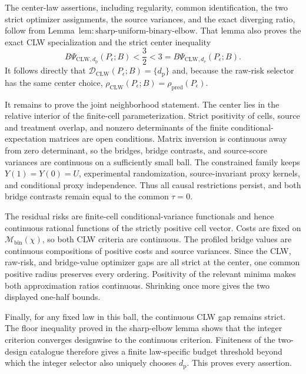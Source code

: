 The center-law assertions, including regularity, common identification, the two strict optimizer assignments, the source variances, and the exact diverging ratio, follow from Lemma~\(\mathrm{lem{:}sharp\text{-}uniform\text{-}binary\text{-}elbow}\). That lemma also proves the exact CLW specialization and the strict center inequality
\[
 B\Psi_{\mathrm{CLW},d_{\mathrm p}}(P_\epsilon;B)
 <\frac32<3
 =B\Psi_{\mathrm{CLW},d_{\mathrm e}}(P_\epsilon;B).        \tag{1}
\]
It follows directly that \(\mathcal D_{\mathrm{CLW}}(P_\epsilon;B)=\{d_{\mathrm p}\}\) and, because the raw-risk selector has the same center choice, \(\rho_{\mathrm{CLW}}(P_\epsilon;B)=\rho_{\mathrm{pred}}(P_\epsilon)\).

It remains to prove the joint neighborhood statement. The center lies in the relative interior of the finite-cell parameterization. Strict positivity of cells, source and treatment overlap, and nonzero determinants of the finite conditional-expectation matrices are open conditions. Matrix inversion is continuous away from zero determinant, so the bridges, bridge contrasts, and source-score variances are continuous on a sufficiently small ball. The constrained family keeps \(Y(1)=Y(0)=U\), experimental randomization, source-invariant proxy kernels, and conditional proxy independence. Thus all causal restrictions persist, and both bridge contrasts remain equal to the common \(\tau=0\).

The residual risks are finite-cell conditional-variance functionals and hence continuous rational functions of the strictly positive cell vector. Costs are fixed on \(\mathcal M_{\mathrm{bin}}(\chi)\), so both CLW criteria are continuous. The profiled bridge values are continuous compositions of positive costs and source variances. Since the CLW, raw-risk, and bridge-value optimizer gaps are all strict at the center, one common positive radius preserves every ordering. Positivity of the relevant minima makes both approximation ratios continuous. Shrinking once more gives the two displayed one-half bounds.

Finally, for any fixed law in this ball, the continuous CLW gap remains strict. The floor inequality proved in the sharp-elbow lemma shows that the integer criterion converges designwise to the continuous criterion. Finiteness of the two-design catalogue therefore gives a finite law-specific budget threshold beyond which the integer selector also uniquely chooses \(d_{\mathrm p}\). This proves every assertion.